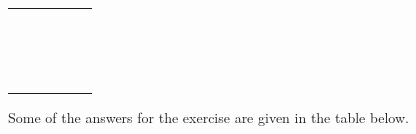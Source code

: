 \begin{exercise}
\begin{table}[H]
\begin{adjustbox}{max width=\textwidth}
\begin{tabular}{|l|l|l|l|l|l|}
                 & & & & & \\
                 & & & & & \\
                 & & & & & \\
                 & & & & & \\
                 & & & & & \\
                 & & & & & \\
                 & & & & & \\
                 & & & & & \\
                 & & & & & \\
                 & & & & & \\
                 & & & & & \\
                 & & & & & \\
                 & & & & & \\
                 & & & & & \\
                 & & & & & \\
                 & & & & & \\
                \bottomrule
            \end{tabular}
        \end{adjustbox}
    \end{table}

    Some of the answers for the exercise are given in the table below.
    

\end{exercise}
